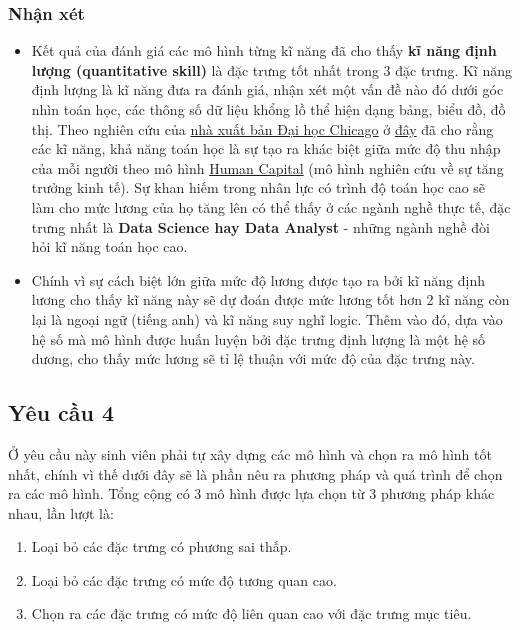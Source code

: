 \documentclass{report}
\begin{document}
    \subsubsection{Nhận xét}
    \begin{itemize}
        \item Kết quả của đánh giá các mô hình từng kĩ năng đã cho thấy \textbf{kĩ năng định lượng (quantitative skill)} là đặc trưng tốt nhất trong 3 đặc trưng. Kĩ năng định lượng là kĩ năng đưa ra đánh giá, nhận xét một vấn đề nào đó dưới góc nhìn toán học, các thông số dữ liệu khổng lồ thể hiện dạng bảng, biểu đồ, đồ thị. Theo nghiên cứu của \href{https://www.journals.uchicago.edu/}{nhà xuất bản Đại học Chicago} ở \href{https://www.journals.uchicago.edu/doi/abs/10.1086/298239}{đây} đã cho rằng các kĩ năng, khả năng toán học là sự tạo ra khác biệt giữa mức độ thu nhập của mỗi người theo mô hình \href{https://www.open.edu/openlearn/mod/oucontent/view.php?id=67143&section=4}{Human Capital} (mô hình nghiên cứu về sự tăng trưởng kinh tế). Sự khan hiếm trong nhân lực có trình độ toán học cao sẽ làm cho mức lương của họ tăng lên có thể thấy ở các ngành nghề thực tế, đặc trưng nhất là \textbf{Data Science hay Data Analyst} - những ngành nghề đòi hỏi kĩ năng toán học cao.
        \item Chính vì sự cách biệt lớn giữa mức độ lương được tạo ra bởi kĩ năng định lương cho thấy kĩ năng này sẽ dự đoán được mức lương tốt hơn 2 kĩ năng còn lại là ngoại ngữ (tiếng anh) và kĩ năng suy nghĩ logic. Thêm vào đó, dựa vào hệ số mà mô hình được huấn luyện bởi đặc trưng định lượng là một hệ số dương, cho thấy mức lương sẽ tỉ lệ thuận với mức độ của đặc trưng này.
    \end{itemize}

\subsection{Yêu cầu 4}
Ở yêu cầu này sinh viên phải tự xây dựng các mô hình và chọn ra mô hình tốt nhất, chính vì thế dưới đây sẽ là phần nêu ra phương pháp và quá trình để chọn ra các mô hình. Tổng cộng có 3 mô hình được lựa chọn từ 3 phương pháp khác nhau, lần lượt là:
\begin{enumerate}
    \item Loại bỏ các đặc trưng có phương sai thấp.
    \item Loại bỏ các đặc trưng có mức độ tương quan cao.
    \item Chọn ra các đặc trưng có mức độ liên quan cao với đặc trưng mục tiêu.
\end{enumerate}
\end{document}
